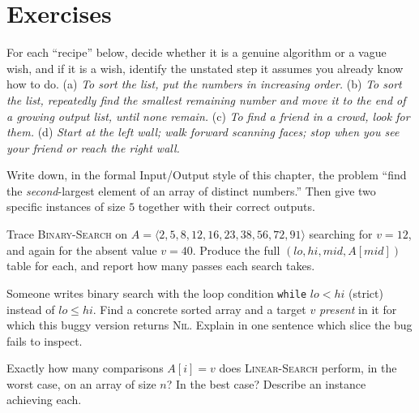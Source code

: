 \section*{Exercises}

\begin{exercise}
For each ``recipe'' below, decide whether it is a genuine algorithm or a vague wish,
and if it is a wish, identify the unstated step it assumes you already know how to do.
(a) \emph{To sort the list, put the numbers in increasing order.}
(b) \emph{To sort the list, repeatedly find the smallest remaining number and move it to
the end of a growing output list, until none remain.}
(c) \emph{To find a friend in a crowd, look for them.}
(d) \emph{Start at the left wall; walk forward scanning faces; stop when you see your
friend or reach the right wall.}
\end{exercise}

\begin{exercise}
Write down, in the formal Input/Output style of this chapter, the problem ``find the
\emph{second}-largest element of an array of distinct numbers.'' Then give two
specific instances of size $5$ together with their correct outputs.
\end{exercise}

\begin{exercise}[Trace it]
Trace \textsc{Binary-Search} on $A = \langle 2,5,8,12,16,23,38,56,72,91\rangle$
searching for $v = 12$, and again for the absent value $v = 40$. Produce the full
$(lo, hi, mid, A[mid])$ table for each, and report how many passes each search takes.
\end{exercise}

\begin{exercise}
Someone writes binary search with the loop condition \texttt{while} $lo < hi$
(strict) instead of $lo \le hi$. Find a concrete sorted array and a target $v$
\emph{present} in it for which this buggy version returns \textsc{Nil}. Explain in
one sentence which slice the bug fails to inspect.
\end{exercise}

\begin{exercise}
Exactly how many comparisons $A[i] = v$ does \textsc{Linear-Search} perform, in the
worst case, on an array of size $n$? In the best case? Describe an instance achieving
each.
\end{exercise}

